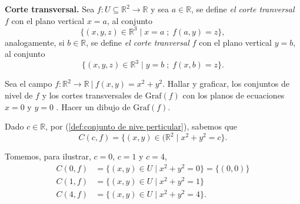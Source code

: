 \begin{definition} \textbf{Corte transversal.}   Sea $f: U  \subseteq  \mathbb{R}^2 \rightarrow \mathbb{R}$ y sea $a \in \mathbb{R}$, se define  \emph{el corte tranversal $f$}  con el plano vertical $x=a$, al conjunto
    \[
    \{   (x,y,z) \in \mathbb{R}^{3} \;|\; x=a \; ;\;   f (a,y)=z \},
     \] analogamente,  si $b \in \mathbb{R}$, se define  \emph{el corte tranversal $f$}  con el plano vertical $y=b$, al conjunto
    \[
    \{   (x,y,z) \in \mathbb{R}^{3} \;|\; y=b \; ;\;   f (x,b)=z \}.
     \]
\end{definition}



\begin{example}\label{example:ex1graf}   Sea  el campo  $f: \mathbb{R}^{2} \rightarrow \mathbb{R} \:|\:  f(x,y)=x^2+y^2.$ Hallar y graficar,  los conjuntos de nivel de $f$ y los cortes transversales  de  $\text{Graf}(f)$ con los planos de ecuaciones $x=0$ y $y=0$ . Hacer un dibujo de  $\text{Graf}(f)$.

        
Dado $c \in \mathbb{R}$, por (\ref{def:conjunto de nive perticular}), sabemos que 
     $$C(c,f)=\{(x,y) \in (\mathbb{R}^2 \;|\;   x^2+y^2  =c \}.$$

Tomemos, para ilustrar,  $c=0$, $c=1$ y $c=4$, 
\begin{align*}   
C(0,f)&=\{(x,y) \in U \;|\; x^2+y^2=0 \}=\{(0,0) \} \\
C(1,f)&=\{(x,y) \in U \;|\; x^2+y^2=1 \} \\
C(4,f)&=\{(x,y) \in U \;|\; x^2+y^2=4 \}.
\end{align*}    
    

 \begin{figure}[H]  
\begin{center}
\end{center}
\end{figure}
\end{example}
